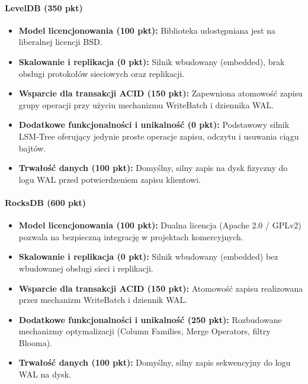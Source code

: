 \paragraph{LevelDB (350 pkt)}
\begin{itemize}
    \item \textbf{Model licencjonowania (100 pkt):} Biblioteka udostępniana jest na liberalnej licencji BSD.
    \item \textbf{Skalowanie i replikacja (0 pkt):} Silnik wbudowany (embedded), brak obsługi protokołów sieciowych oraz replikacji.
    \item \textbf{Wsparcie dla transakcji ACID (150 pkt):} Zapewniona atomowość zapisu grupy operacji przy użyciu mechanizmu WriteBatch i dziennika WAL.
    \item \textbf{Dodatkowe funkcjonalności i unikalność (0 pkt):} Podstawowy silnik LSM-Tree oferujący jedynie proste operacje zapisu, odczytu i usuwania ciągu bajtów.
    \item \textbf{Trwałość danych (100 pkt):} Domyślny, silny zapis na dysk fizyczny do logu WAL przed potwierdzeniem zapisu klientowi.
\end{itemize}

\paragraph{RocksDB (600 pkt)}
\begin{itemize}
    \item \textbf{Model licencjonowania (100 pkt):} Dualna licencja (Apache 2.0 / GPLv2) pozwala na bezpieczną integrację w projektach komercyjnych.
    \item \textbf{Skalowanie i replikacja (0 pkt):} Silnik wbudowany (embedded) bez wbudowanej obsługi sieci i replikacji.
    \item \textbf{Wsparcie dla transakcji ACID (150 pkt):} Atomowość zapisu realizowana przez mechanizm WriteBatch i dziennik WAL.
    \item \textbf{Dodatkowe funkcjonalności i unikalność (250 pkt):} Rozbudowane mechanizmy optymalizacji (Column Families, Merge Operators, filtry Blooma).
    \item \textbf{Trwałość danych (100 pkt):} Domyślny, silny zapis sekwencyjny do logu WAL na dysk.
\end{itemize}

